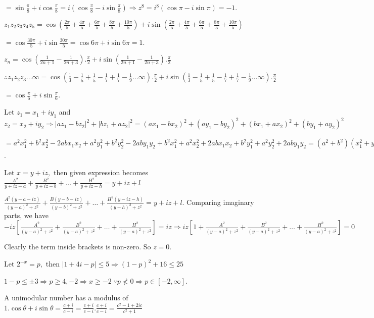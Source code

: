   $= \sin\frac{\pi}{8} + i\cos\frac{\pi}{8} = i\left(\cos\frac{\pi}{8} - i\sin\frac{\pi}{8}\right)
  \Rightarrow z^8 = i^8(\cos\pi - i\sin\pi) = -1$.
\item $z_1z_2z_3z_4z_5 = \cos\left(\frac{2\pi}{5} + \frac{4\pi}{5} + \frac{6\pi}{5} + \frac{8\pi}{5} +
  \frac{10\pi}{5}\right) + i\sin\left(\frac{2\pi}{5} + \frac{4\pi}{5} + \frac{6\pi}{5} + \frac{8\pi}{5} +
  \frac{10\pi}{5}\right)$

  $= \cos\frac{30\pi}{5} + i\sin\frac{30\pi}{5} = \cos6\pi + i\sin6\pi = 1$.
\item $z_n = \cos\left(\frac{1}{2n + 1} - \frac{1}{2n + 3}\right).\frac{\pi}{2} + i\sin\left(\frac{1}{2n +
  1} - \frac{1}{2n + 3}\right).\frac{\pi}{2}$

  $\therefore z_1z_2z_3\ldots\infty = \cos\left(\frac{1}{3} - \frac{1}{5} + \frac{1}{5} - \frac{1}{7} +
  \frac{1}{7} - \frac{1}{9}\ldots\infty\right).\frac{\pi}{2} + i\sin\left(\frac{1}{3} - \frac{1}{5} +
  \frac{1}{5} - \frac{1}{7} + \frac{1}{7} - \frac{1}{9}\ldots\infty\right).\frac{\pi}{2}$

  $= \cos\frac{\pi}{6} + i\sin\frac{\pi}{6}$.
\item Let $z_1 = x_1 + iy_1$ and $z_2 = x_2 + iy_2\Rightarrow |az_1 - bz_2|^2 + |bz_1 + az_2|^2 = (ax_1 -
  bx_2)^2 + (ay_1 - by_2)^2 + (bx_1 + ax_2)^2 + (by_1 + ay_2)^2$

  $= a^2x_1^2 + b^2x_2^2 -2abx_1x_2 + a^2y_1^2 + b^2y_2^2 - 2aby_1y_2 + b^2x_1^2 + a^2x_2^2 + 2abx_1x_2 +
  b^2y_1^2 + a^2y_2^2 + 2aby_1y_2 = (a^2 + b^2)(x_1^2 + y_1^2 + x_2^2 + y_2^2)= (a^2 + b^2)(|z_1|^2 +
  |z_2|^2)$.
\item Let $x = y + iz,$ then given expression becomes $\frac{A^2}{y + iz - a} + \frac{B^2}{y + iz - b} +
  \ldots + \frac{H^2}{y + iz - h} = y + iz + l$

  $\frac{A^2(y - a - iz)}{(y - a)^2 + z^2} + \frac{B(y - b - iz)}{(y - b)^2 + z^2} + \ldots + \frac{H^2(y -
    iz - h)}{(y - h)^2 + z^2} = y + iz + l$.  Comparing imaginary parts, we have
  $-iz\left[\frac{A^2}{(y - a)^2 + z^2} + \frac{B^2}{(y - a)^2 + z^2} + \ldots + \frac{H^2}{(y - a)^2 +
      z^2}\right] = iz \Rightarrow iz\left[1 + \frac{A^2}{(y - a)^2 + z^2} + \frac{B^2}{(y - a)^2 + z^2} +
    \ldots + \frac{H^2}{(y - a)^2 + z^2}\right] = 0$

  Clearly the term inside brackets is non-zero. So $z = 0$.
\item Let $2^{-x} = p,$ then $|1 + 4i - p|\leq 5 \Rightarrow (1 - p)^2 + 16 \leq 25$

  $1 - p \leq \pm3 \Rightarrow p \geq 4, -2 \Rightarrow x \geq -2\;\because p \nless 0\Rightarrow p \in [-2,
  \infty]$.
\item A unimodular number has a modulus of $1. \cos\theta + i\sin\theta = \frac{c + i}{c - i} = \frac{c +
  i}{c - i}.\frac{c + i}{c - i} = \frac{c^2 - 1 + 2ic}{c^2 + 1}$

